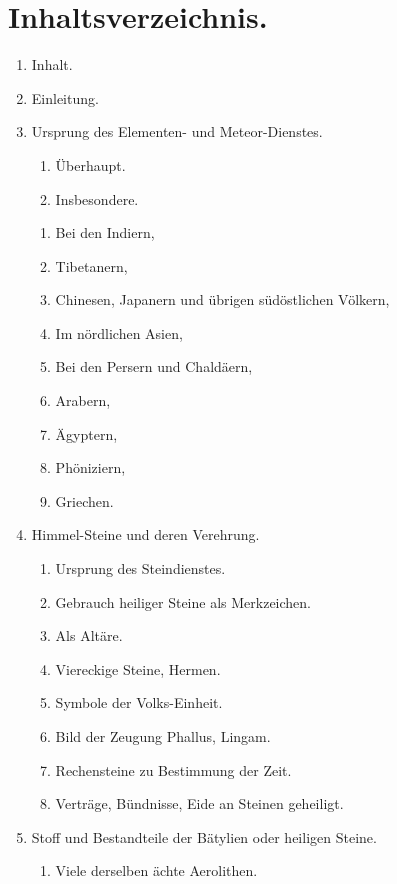 \documentclass[a4paper, 11pt, oneside, polutonikogreek, german]{article}
\begin{document}
\section*{Inhaltsverzeichnis.}
\begin{enumerate}
    \item[] Inhalt.
    \item[] Einleitung.
    \item Ursprung des Elementen- und Meteor-Dienstes.
    \begin{enumerate}
        \item Überhaupt.
        \item Insbesondere.
    \end{enumerate}
    \begin{enumerate}
        \item Bei den Indiern,
        \item Tibetanern,
        \item Chinesen, Japanern und übrigen südöstlichen Völkern,
        \item Im nördlichen Asien,
        \item Bei den Persern und Chaldäern,
        \item Arabern,
        \item Ägyptern,
        \item Phöniziern,
        \item Griechen.
    \end{enumerate}
    \item Himmel-Steine und deren Verehrung.
    \begin{enumerate}
        \item Ursprung des Steindienstes.
        \item Gebrauch heiliger Steine als Merkzeichen.
        \item Als Altäre.
        \item Viereckige Steine, Hermen.
        \item Symbole der Volks-Einheit.
        \item Bild der Zeugung Phallus, Lingam.
        \item Rechensteine zu Bestimmung der Zeit.
        \item Verträge, Bündnisse, Eide an Steinen geheiligt.
    \end{enumerate}
    \item Stoff und Bestandteile der Bätylien oder heiligen Steine.
    \begin{enumerate}
        \item Viele derselben ächte Aerolithen.

\end{enumerate}
\end{enumerate}
\end{document}
